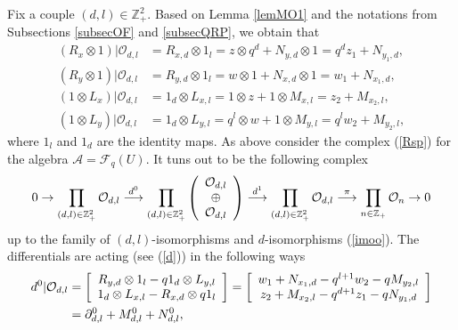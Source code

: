 \documentclass[12pt,reqno]{amsart}%
\theoremstyle{plain}
\numberwithin{theorem}{section} \numberwithin{equation}{section}
\numberwithin{lemma}{section}
\numberwithin{remark}{section}
\numberwithin{example}{section}
\numberwithin{proposition}{section}
\numberwithin{definition}{section}
\numberwithin{corollary}{section}
\begin{document}
Fix a couple $\left(  d,l\right)  \in\mathbb{Z}_{+}^{2}$. Based on Lemma
\ref{lemMO1} and the notations from Subsections \ref{subsecOF} and
\ref{subsecQRP}, we obtain that
\begin{align*}
\left(  R_{x}\otimes1\right)  |\mathcal{O}_{d,l}  &  =R_{x,d}\otimes
1_{l}=z\otimes q^{d}+N_{y,d}\otimes1=q^{d}z_{1}+N_{y_{1},d},\\
\left(  R_{y}\otimes1\right)  |\mathcal{O}_{d,l}  &  =R_{y,d}\otimes
1_{l}=w\otimes1+N_{x,d}\otimes1=w_{1}+N_{x_{1},d},\\
\left(  1\otimes L_{x}\right)  |\mathcal{O}_{d,l}  &  =1_{d}\otimes
L_{x,l}=1\otimes z+1\otimes M_{x,l}=z_{2}+M_{x_{2},l},\\
\left(  1\otimes L_{y}\right)  |\mathcal{O}_{d,l}  &  =1_{d}\otimes
L_{y,l}=q^{l}\otimes w+1\otimes M_{y,l}=q^{l}w_{2}+M_{y_{2},l},
\end{align*}
where $1_{l}$ and $1_{d}$ are the identity maps. As above consider the complex
(\ref{Rsp}) for the algebra $\mathcal{A=F}_{q}\left(  U\right)  $. It tuns out
to be the following complex
\begin{equation}
0\rightarrow\prod\limits_{\left(  d,l\right)  \in\mathbb{Z}_{+}^{2}%
}\mathcal{O}_{d,l}\overset{d^{0}}{\longrightarrow}\prod\limits_{\left(
d,l\right)  \in\mathbb{Z}_{+}^{2}}\left(
\begin{array}
[c]{c}%
\mathcal{O}_{d,l}\\
\oplus\\
\mathcal{O}_{d,l}%
\end{array}
\right)  \overset{d^{1}}{\longrightarrow}\prod\limits_{\left(  d,l\right)
\in\mathbb{Z}_{+}^{2}}\mathcal{O}_{d,l}\overset{\pi}{\longrightarrow}%
\prod\limits_{n\in\mathbb{Z}_{+}}\mathcal{O}_{n}\rightarrow0 \label{Oc}%
\end{equation}
up to the family of $\left(  d,l\right)  $-isomorphisms and $d$-isomorphisms
(\ref{imoo}). The differentials are acting (see (\ref{d})) in the following
ways%
\begin{align*}
d^{0}|\mathcal{O}_{d,l}  &  =\left[
\begin{array}
[c]{c}%
R_{y,d}\otimes1_{l}-q1_{d}\otimes L_{y,l}\\
1_{d}\otimes L_{x,l}-R_{x,d}\otimes q1_{l}%
\end{array}
\right]  =\left[
\begin{array}
[c]{c}%
w_{1}+N_{x_{1},d}-q^{l+1}w_{2}-qM_{y_{2},l}\\
z_{2}+M_{x_{2},l}-q^{d+1}z_{1}-qN_{y_{1},d}%
\end{array}
\right] \\
&  =\partial_{d,l}^{0}+M_{d,l}^{0}+N_{d,l}^{0},
\end{align*}
\end{document}
